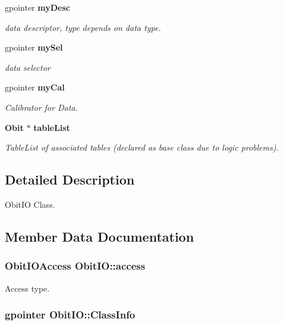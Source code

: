 \begin{CompactItemize}
gpointer {\bf my\-Desc}
\begin{CompactList}\small\item\em data descriptor, type depends on data type. \item\end{CompactList}\item 
gpointer {\bf my\-Sel}
\begin{CompactList}\small\item\em data selector \item\end{CompactList}\item 
gpointer {\bf my\-Cal}
\begin{CompactList}\small\item\em Calibrator for Data. \item\end{CompactList}\item 
{\bf Obit} $\ast$ {\bf table\-List}
\begin{CompactList}\small\item\em Table\-List of associated tables (declared as base class due to logic problems). \item\end{CompactList}\end{CompactItemize}


\subsection{Detailed Description}
Obit\-IO Class. 



\subsection{Member Data Documentation}
\subsubsection{\setlength{\rightskip}{0pt plus 5cm}Obit\-IOAccess {\bf Obit\-IO::access}}\label{structObitIO_o4}


Access type. 

\subsubsection{\setlength{\rightskip}{0pt plus 5cm}gpointer {\bf Obit\-IO::Class\-Info}}\label{structObitIO_o1}



